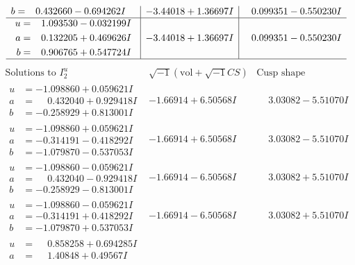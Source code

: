 \documentclass[1p]{elsarticle_modified}
\theoremstyle{definition}
\newcommand{\I}{\sqrt{-1}}
\begin{document}
$$\begin{array}{c|c|c}
\begin{aligned}
b &= \phantom{-}0.432660 - 0.694262 I\end{aligned}
 & -3.44018 + 1.36697 I & \phantom{-}0.099351 - 0.550230 I \\ \hline\begin{aligned}
u &= \phantom{-}1.093530 - 0.032199 I \\
a &= \phantom{-}0.132205 + 0.469626 I \\
b &= \phantom{-}0.906765 + 0.547724 I\end{aligned}
 & -3.44018 + 1.36697 I & \phantom{-}0.099351 - 0.550230 I\\
 \hline 
 \end{array}$$\newpage$$\begin{array}{c|c|c}  
\text{Solutions to }I^u_{2}& \I (\text{vol} + \sqrt{-1}CS) & \text{Cusp shape}\\
 \hline 
\begin{aligned}
u &= -1.098860 + 0.059621 I \\
a &= \phantom{-}0.432040 + 0.929418 I \\
b &= -0.258929 + 0.813001 I\end{aligned}
 & -1.66914 + 6.50568 I & \phantom{-}3.03082 - 5.51070 I \\ \hline\begin{aligned}
u &= -1.098860 + 0.059621 I \\
a &= -0.314191 - 0.418292 I \\
b &= -1.079870 - 0.537053 I\end{aligned}
 & -1.66914 + 6.50568 I & \phantom{-}3.03082 - 5.51070 I \\ \hline\begin{aligned}
u &= -1.098860 - 0.059621 I \\
a &= \phantom{-}0.432040 - 0.929418 I \\
b &= -0.258929 - 0.813001 I\end{aligned}
 & -1.66914 - 6.50568 I & \phantom{-}3.03082 + 5.51070 I \\ \hline\begin{aligned}
u &= -1.098860 - 0.059621 I \\
a &= -0.314191 + 0.418292 I \\
b &= -1.079870 + 0.537053 I\end{aligned}
 & -1.66914 - 6.50568 I & \phantom{-}3.03082 + 5.51070 I \\ \hline\begin{aligned}
u &= \phantom{-}0.858258 + 0.694285 I \\
a &= \phantom{-}1.40848 + 0.49567 I \\

\end{aligned}
\end{array}$$
\end{document}
